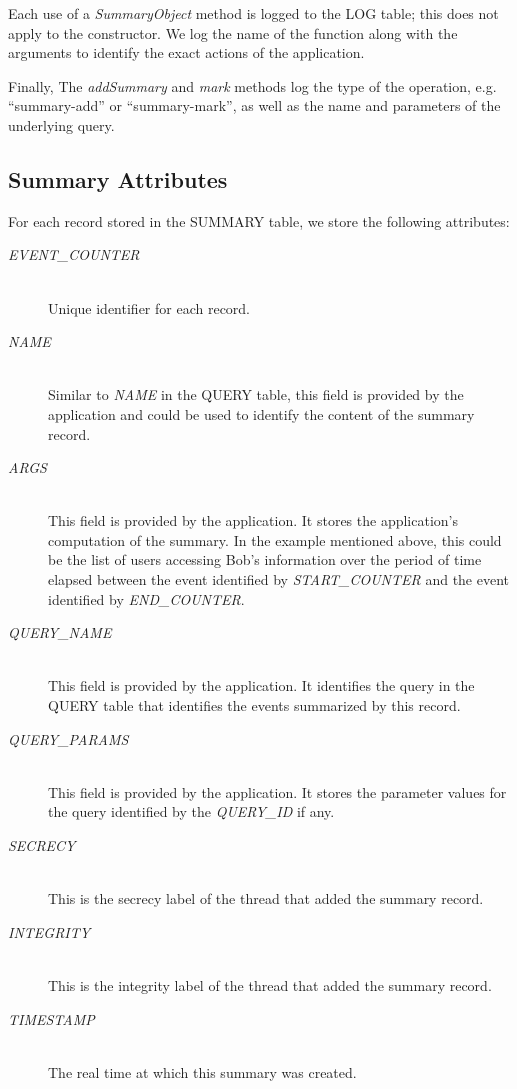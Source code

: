 Each use of a \emph{SummaryObject} method is logged to the LOG table; this does not apply to the constructor. We log the name of the function along with the arguments to identify the exact actions of the application.

Finally, The \emph{addSummary} and \emph{mark} methods log the type of the operation, e.g. ``summary-add'' or ``summary-mark'', as well as the name and parameters of the underlying query.

\subsection{Summary Attributes}

For each record stored in the SUMMARY table, we store the following attributes:

\begin{description}
  \item[\emph{EVENT\_COUNTER}] \ \\
    Unique identifier for each record.
  \item[\emph{NAME}] \ \\
    Similar to \emph{NAME} in the QUERY table,
    this field is provided by the application and
    could be used to identify the content of the
    summary record.
  \item[\emph{ARGS}] \ \\
    This field is provided by the application.
    It stores the application's computation of the summary.
    In the example mentioned above, this could be the 
    list of users accessing Bob's information over the
    period of time elapsed between the event
    identified by \emph{START\_COUNTER} and the
    event identified by \emph{END\_COUNTER}.
  \item[\emph{QUERY\_NAME}] \ \\
    This field is provided by the application.
    It identifies the query in the QUERY table
    that identifies the events summarized
    by this record.
  \item[\emph{QUERY\_PARAMS}] \ \\
    This field is provided by the application.
    It stores the parameter values for the query
    identified by the \emph{QUERY\_ID} if any.
  \item[\emph{SECRECY}] \ \\
    This is the secrecy label of the thread 
    that added the summary record.
  \item[\emph{INTEGRITY}] \ \\
    This is the integrity label of the thread 
    that added the summary record.
  \item[\emph{TIMESTAMP}] \ \\
    The real time at which this summary was created.
\end{description}


